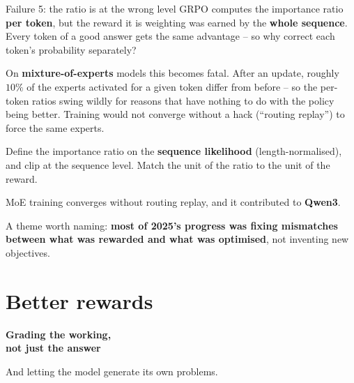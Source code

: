 \documentclass[aspectratio=169]{beamer}
\begin{document}
\begin{frame}{Failure 5: the ratio is at the wrong level}
  \small
  GRPO computes the importance ratio \textbf{per token}, but the reward it is weighting was
  earned by the \textbf{whole sequence}. Every token of a good answer gets the same advantage --
  so why correct each token's probability separately?

  \vskip 6pt
  \begin{tcolorbox}[colback=armred!8, colframe=armred, boxrule=0.6pt, arc=2pt]
    \small
    On \textbf{mixture-of-experts} models this becomes fatal. After an update, roughly $10\%$ of
    the experts activated for a given token differ from before -- so the per-token ratios swing
    wildly for reasons that have nothing to do with the policy being better. Training would not
    converge without a hack (``routing replay'') to force the same experts.
  \end{tcolorbox}

  \vskip 6pt
  \begin{tcolorbox}[colback=paramgreen!8, colframe=paramgreen, boxrule=0.7pt, arc=2pt,
                    title={\textbf{Group Sequence Policy Optimization} (\textbf{GSPO}, Zheng et al., Qwen team, 2025)}]
    \small
    Define the importance ratio on the \textbf{sequence likelihood} (length-normalised), and clip
    at the sequence level. Match the unit of the ratio to the unit of the reward.

    \vskip 3pt
    MoE training converges without routing replay, and it contributed to \textbf{Qwen3}.
  \end{tcolorbox}

  \vskip 4pt
  \begin{center}
    \footnotesize
    A theme worth naming: \textbf{most of 2025's progress was fixing mismatches between what was
    rewarded and what was optimised}, not inventing new objectives.
  \end{center}
\end{frame}

\section{Better rewards}
\begin{frame}[plain]
  \begin{center}
    \vskip 1.6cm
    {\Huge\bfseries\color{popblue}Grading the working,\\ not just the answer}

    \vskip 0.6cm
    {\large And letting the model generate its own problems.}
  \end{center}
\end{frame}
\end{document}
